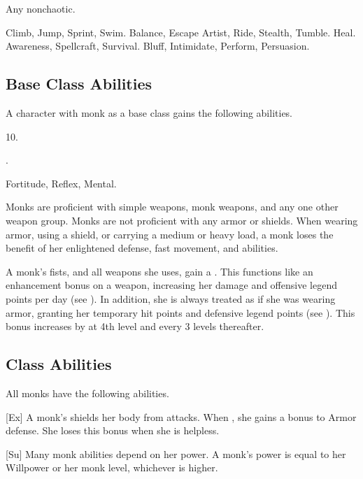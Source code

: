      Any nonchaotic.

     Climb, Jump, Sprint, Swim.
     Balance, Escape Artist, Ride, Stealth, Tumble.
     Heal.
     Awareness, Spellcraft, Survival.
     Bluff, Intimidate, Perform, Persuasion.

    \subsection{Base Class Abilities}
        A character with monk as a base class gains the following abilities.

         10.

         .

          Fortitude,  Reflex,  Mental.

        Monks are proficient with simple weapons, monk weapons, and any one other weapon group.
        Monks are not proficient with any armor or shields.
        When wearing armor, using a shield, or carrying a medium or heavy load, a monk loses the benefit of her enlightened defense, fast movement, and \ki abilities.

         A monk's fists, and all weapons she uses, gain a  .
        This functions like an enhancement bonus on a weapon, increasing her damage and offensive legend points per day (see ).
        In addition, she is always treated as if she was wearing  armor, granting her temporary hit points and defensive legend points (see ).
        This bonus increases by  at 4th level and every 3 levels thereafter.

    \subsection{Class Abilities}
        All monks have the following abilities.

        [Ex]
        A monk's \ki shields her body from attacks.
        When \monkunencumbered, she gains a  bonus to Armor defense.
        She loses this bonus when she is helpless.

        [Su]
        Many monk abilities depend on her \ki power.
        A monk's \ki power is equal to her Willpower or her monk level, whichever is higher.

